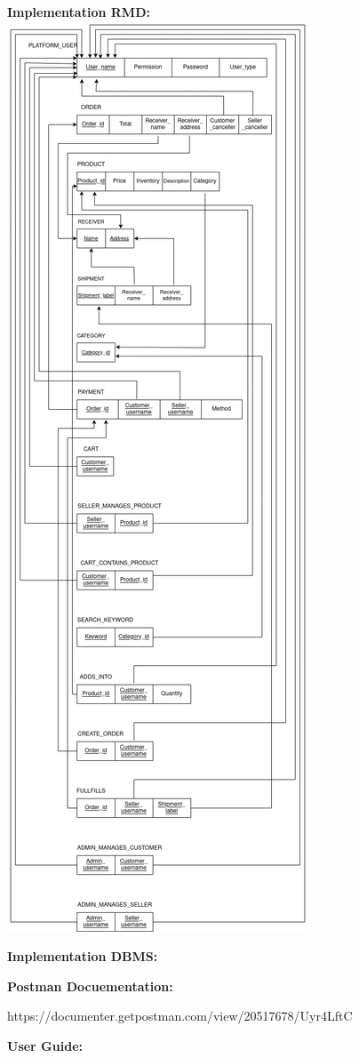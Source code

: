 \documentclass[12pt]{article}
\begin{document}
\newpage
\textbf{Implementation RMD:}
\includegraphics[height=.98\textheight]{Diagrams/relation.png}

\newpage 
\textbf{Implementation DBMS:}


\newpage

\textbf{Postman Docuementation:}

\begin{center}
    https://documenter.getpostman.com/view/20517678/Uyr4LftC
\end{center}

\newpage 
\textbf{User Guide:}
\end{document}
